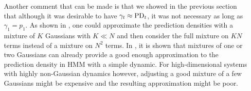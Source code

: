 Another comment that can be made is that we showed in the previous section that although it was desirable to have $\gamma_{t}\approx \text{PD}_{t}$, it was not necessary as long as $\gamma_{1}=p_{1}$. As shown in \citet{taghavi12}, one could approximate the prediction densities with a mixture of $K$ Gaussians with $K\ll N$ and then consider the full mixture on $KN$ terms instead of a mixture on $N^{2}$ terms. In \citet{taghavi12}, it is shown that mixtures of one or two Gaussians can already provide a good enough approximation to the prediction density in HMM with a simple dynamic. For high-dimensional systems with highly non-Gaussian dynamics however, adjusting a good mixture of a few Gaussians might be expensive and the resulting approximation might be poor.

